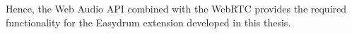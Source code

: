 Hence, the Web Audio API combined with the WebRTC provides the required functionality for the Easydrum extension developed in this thesis.






